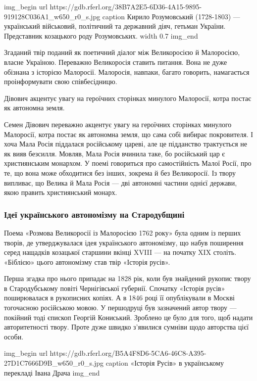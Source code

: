 \ifcmt
img_begin 
  url https://gdb.rferl.org/38B7A2E5-6D36-4A15-9895-919128C036A1_w650_r0_s.jpg
  caption Кирило Розумовський (1728-1803) --- український військовий, політичний та державний діяч, гетьман України. Представник козацького роду Розумовських.
  width 0.7
img_end
\fi

Згаданий твір поданий як поетичний діалог між Великоросією й Малоросією, власне
Україною. Переважно Великоросія ставить питання. Вона не дуже обізнана з
історією Малоросії. Малоросія, навпаки, багато говорить, намагається
проінформувати свою співбесідницю.

\begin{minipage}
	Дівович акцентує увагу на героїчних сторінках минулого Малоросії, котра постає
	як автономна земля.
\end{minipage}

Семен Дівович переважно акцентує увагу на героїчних сторінках минулого
Малоросії, котра постає як автономна земля, що сама собі вибирає покровителя. І
хоча Мала Росія піддалася російському цареві, але це підданство трактується не
як вияв безсилля. Мовляв, Мала Росія вчинила таке, бо російський цар є
християнським монархом. У поемі говориться про самостійність Малої Росії, про
те, що вона може обходитися без інших, зокрема й без Великоросії. Із твору
випливає, що Велика й Мала Росія --- дві автономні частини однієї держави, якою
править християнський монарх.

\subsubsection{Ідеї українського автономізму на Стародубщині}

Поема «Розмова Великоросії із Малоросією 1762 року» була одним із перших
творів, де утверджувалася ідея українського автономізму, що набув поширення
серед нащадків козацької старшини вкінці XVIII --- на початку XIX століть.
«Біблією» цього автономізму став твір «Історія русів».

Перша згадка про нього припадає на 1828 рік, коли був знайдений рукопис твору в
Стародубському повіті Чернігівської губернії. Спочатку «Історія русів»
поширювалася в рукописних копіях. А в 1846 році її опублікували в Москві
тогочасною російською мовою. У першодруці був зазначений автор твору --- покійний
тоді єпископ Георгій Кониський. Зроблено це було для того, щоб надати
авторитетності твору. Проте дуже швидко з’явилися сумніви щодо авторства цієї
особи.

\ifcmt
img_begin 
	url https://gdb.rferl.org/B5A4F8D6-5CA6-46C8-A395-27D1C7666D9B_w650_r0_s.jpg
	caption «Історія Русів» в українському перекладі Івана Драча
img_end
\fi

